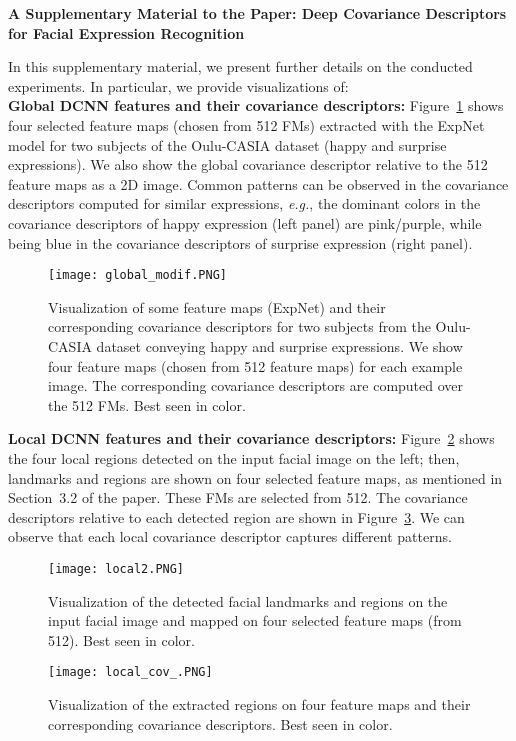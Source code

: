 \documentclass{bmvc2k}
\begin{document}
\begin{center}{\Large \textbf{A Supplementary Material to the Paper: Deep Covariance Descriptors for Facial Expression Recognition\\}}
\end{center}
In this supplementary material, we present further details on the conducted experiments. 
In particular, we provide visualizations of: \\


 \textbf{Global DCNN features and their covariance descriptors:} 
 Figure~\ref{fig:feature-maps} shows four selected feature maps (chosen from 512 FMs) extracted with the ExpNet model for two subjects of the Oulu-CASIA dataset (happy and surprise expressions). We also show the global covariance descriptor relative to the 512 feature maps as a 2D image. Common patterns can be observed in the covariance descriptors computed for similar expressions, \emph{e.g.}, the dominant colors in the covariance descriptors of happy expression (left panel) are pink/purple, while being blue in the covariance descriptors of surprise expression (right panel). 

\begin{figure}[!ht]
\centering
\texttt{[image: global\_modif.PNG]}
\caption{Visualization of some feature maps (ExpNet) and their corresponding covariance descriptors for two subjects from the Oulu-CASIA dataset conveying happy and surprise expressions. We show four feature maps (chosen from 512 feature maps) for each example image. The corresponding covariance descriptors are computed over the 512 FMs. Best seen in color.}
\label{fig:feature-maps}
\end{figure}

\textbf{Local DCNN features and their covariance descriptors:} Figure~\ref{fig:RegionFMs} shows the four local regions detected on the input facial image on the left; then, landmarks and regions are shown on four selected feature maps, as mentioned in Section~3.2 of the paper. These FMs are selected from 512. 
The covariance descriptors relative to each detected region are shown in Figure~\ref{fig:RegionCovs}. We can observe that each local covariance descriptor captures different patterns. 
\begin{figure}[!ht]
\centering
\texttt{[image: local2.PNG]}
\caption{Visualization of the detected facial landmarks and regions on the input facial image and mapped on four selected feature maps (from 512). Best seen in color.}
\label{fig:RegionFMs}
\end{figure}
\begin{figure}[!ht]
\centering
\texttt{[image: local\_cov\_.PNG]}
\caption{Visualization of the extracted regions on four feature maps and their corresponding covariance descriptors. Best seen in color.}
\label{fig:RegionCovs}
\end{figure}
\end{document}
